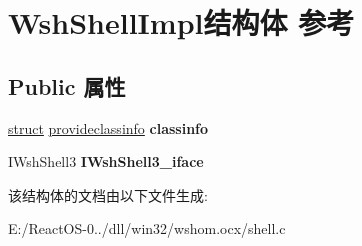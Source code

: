 \hypertarget{struct_wsh_shell_impl}{}\section{Wsh\+Shell\+Impl结构体 参考}
\label{struct_wsh_shell_impl}
\subsection*{Public 属性}
\begin{DoxyCompactItemize}
\item 
\mbox{\label{struct_wsh_shell_impl_aff3c9b0b07c4e0f9757527b487a7bc4e}} 
\hyperlink{interfacestruct}{struct} \hyperlink{structprovideclassinfo}{provideclassinfo} {\bfseries classinfo}
\item 
\mbox{\label{struct_wsh_shell_impl_a330bf79e27b402da021f871d55f0923e}} 
I\+Wsh\+Shell3 {\bfseries I\+Wsh\+Shell3\+\_\+iface}
\end{DoxyCompactItemize}


该结构体的文档由以下文件生成\+:\begin{DoxyCompactItemize}
\item 
E\+:/\+React\+O\+S-\/0../dll/win32/wshom.\+ocx/shell.\+c\end{DoxyCompactItemize}
